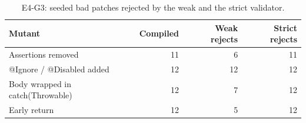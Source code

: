\begin{table}[t]
\centering
\footnotesize
\caption{E4-G3: seeded bad patches rejected by the weak and the strict validator.}
\label{tab:g3}
\begin{tabular}{lrrr}
\toprule
\textbf{Mutant} & \textbf{Compiled} & \textbf{Weak rejects} & \textbf{Strict rejects} \\
\midrule
Assertions removed & 11 & 6 & 11 \\
@Ignore / @Disabled added & 12 & 12 & 12 \\
Body wrapped in catch(Throwable) & 12 & 7 & 12 \\
Early return & 12 & 5 & 12 \\
\bottomrule
\end{tabular}
\end{table}
